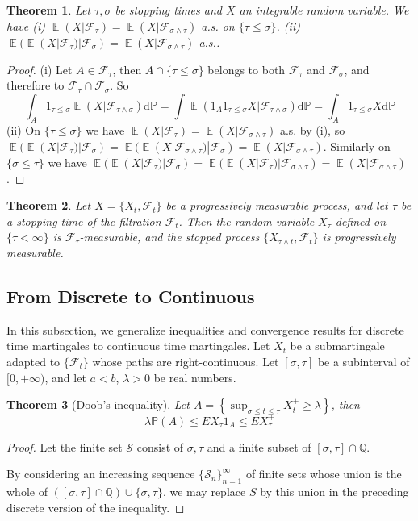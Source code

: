 \documentclass{article}
\newtheorem{Thm}{Theorem}[section]
\theoremstyle{definition}
\newcommand{\EE}{\operatorname{\mathbb{E}}}
\newcommand{\PP}{\mathbb{P}}
\renewcommand{\leq}{\leqslant}
\renewcommand{\geq}{\geqslant}
\newcommand{\<}{\left\langle}
\renewcommand{\>}{\right\rangle}
\begin{document}
\begin{Thm}
    Let $\tau,\sigma$ be stopping times and $X$ an integrable random variable. We have \newline 
    (i) $\EE(X|\mathcal{F}_\tau)=\EE(X|\mathcal{F}_{\sigma\wedge \tau})$ a.s. on $\{\tau\leq \sigma\}$.\newline 
    (ii) $\EE(\EE(X|\mathcal{F}_\tau)|\mathcal{F}_\sigma)=\EE(X|\mathcal{F}_{\sigma\wedge \tau})$ a.s..
\end{Thm}
\begin{proof}
    (i) Let $A\in\mathcal{F}_\tau$, then $A\cap \{\tau\leq \sigma\}$ belongs to both $\mathcal{F}_\tau$ and $\mathcal{F}_\sigma$, and therefore to $\mathcal{F}_\tau\cap\mathcal{F}_\sigma$. So 
    \[ \int_A 1_{\tau\leq \sigma} \EE(X|\mathcal{F}_{\tau\wedge\sigma})\mathrm{d}\PP=\int \EE(1_A1_{\tau\leq \sigma}X|\mathcal{F}_{\tau\wedge\sigma})\mathrm{d}\PP=\int_A1_{\tau\leq \sigma}X\mathrm{d}\PP\]
    (ii) On $\{\tau\leq\sigma\}$ we have $\EE(X|\mathcal{F}_\tau)=\EE(X|\mathcal{F}_{\sigma\wedge \tau})$ a.s. by (i), so 
    $\EE(\EE(X|\mathcal{F}_\tau)|\mathcal{F}_\sigma)=\EE(\EE(X|\mathcal{F}_{\sigma\wedge \tau})|\mathcal{F}_\sigma)=\EE(X|\mathcal{F}_{\sigma\wedge \tau})$. Similarly on
    $\{\sigma\leq \tau\}$ we have $\EE(\EE(X|\mathcal{F}_\tau)|\mathcal{F}_\sigma)=\EE(\EE(X|\mathcal{F}_\tau)|\mathcal{F}_{\sigma\wedge \tau})=\EE(X|\mathcal{F}_{\sigma\wedge \tau})$.
\end{proof}
\begin{Thm}
    Let $X=\{X_t,\mathcal{F}_t\}$ be a progressively measurable process, and let $\tau$ be a stopping time of the filtration $\mathcal{F}_t$.
    Then the random variable $X_\tau$ defined on $\{\tau<\infty\}$ is $\mathcal{F}_\tau$-measurable, and the stopped process 
    $\{X_{\tau\wedge t},\mathcal{F}_t\}$ is progressively measurable.
\end{Thm}



\subsection{From Discrete to Continuous}
In this subsection, we generalize inequalities and convergence results for discrete time martingales to continuous time martingales.\newline 
Let $X_t$ be a submartingale adapted to $\{\mathcal{F}_t\}$ whose paths are right-continuous. Let $[\sigma,\tau]$ be a subinterval of $[0,+\infty)$,
and let $a<b$, $\lambda>0$ be real numbers.
\begin{Thm}[Doob's inequality]
    Let $A=\left\{ \sup_{\sigma\leq t\leq \tau}X_t^+  \geq\lambda\right\}$, then \[\lambda \PP(A)\leq EX_\tau1_A\leq EX_\tau^+\]
\end{Thm}
\begin{proof}
    Let the finite set $\mathcal{S}$ consist of $\sigma,\tau$ and a finite subset of $[\sigma,\tau]\cap \mathbb{Q}$.

    By considering an increasing sequence $\{\mathcal{S}_n\}_{n=1}^\infty$ of finite sets whose union is the whole of $([\sigma,\tau]\cap \mathbb{Q})\cup\{\sigma,\tau\}$,
    we may replace $S$ by this union in the preceding discrete version of the inequality.
\end{proof}
\end{document}
